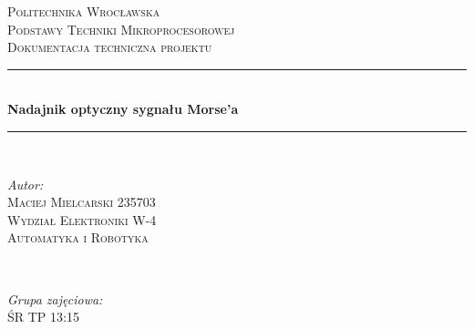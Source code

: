 \documentclass{article}
\begin{document}
\begin{titlepage} %
	\newcommand{\HRule}{\rule{\linewidth}{0.5mm}} %
	
	\center %
	
	
	\textsc{\LARGE Politechnika Wrocławska}\\[1.5cm] %
	
	\textsc{\Large Podstawy Techniki Mikroprocesorowej}\\[0.5cm] %
	
	\textsc{\large Dokumentacja techniczna projektu}\\[0.5cm] %
	
	
	\HRule\\[0.4cm]
	
	{\huge\bfseries Nadajnik optyczny sygnału Morse'a}\\[0.4cm] %
	
	\HRule\\[1.5cm]
	
	
	\begin{minipage}{0.5\textwidth}
		\begin{flushleft}
			\large
			\textit{Autor:}\\
			\textsc{Maciej Mielcarski 235703\\Wydział Elektroniki W-4\\Automatyka i Robotyka} %
		\end{flushleft}
	\end{minipage}
	~
	\begin{minipage}{0.4\textwidth}
		\begin{flushright}
			\large
			\textit{Grupa zajęciowa:}\\
			\textsc{ŚR TP 13:15} %
		\end{flushright}
	\end{minipage}
	


\end{titlepage}
\end{document}
